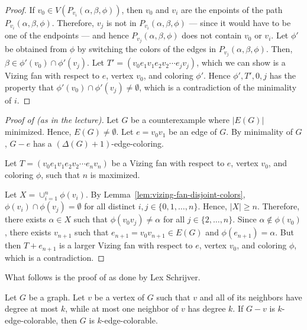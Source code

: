 \begin{proof}
    If \(v_0 \in V(P_{v_i}(\alpha, \beta, \phi))\),
    then \(v_0\) and \(v_i\) are the enpoints of the path \(P_{v_i}(\alpha, \beta, \phi)\).
    Therefore, \(v_j\) is not in \(P_{v_i}(\alpha, \beta, \phi)\) --- since it would have to be one of the endpoints ---
    and hence \(P_{v_j}(\alpha, \beta, \phi)\) does not contain \(v_0\) or \(v_i\).
    Let \(\phi'\) be obtained from \(\phi\) by
    switching the colors of the edges in \(P_{v_j}(\alpha, \beta, \phi)\).
    Then, \(\beta \in \phi'(v_0) \cap \phi'(v_j)\).
    Let \(T' = (v_0e_1v_1e_2v_2 \cdots e_jv_j)\),
    which we can show is a Vizing fan with respect to \(e\), vertex \(v_0\), and coloring \(\phi'\).
    Hence \(\phi', T', 0, j\) has the property that \(\phi'(v_0) \cap \phi'(v_j) \neq \emptyset\), which is a contradiction of the minimality of \(i\).
\end{proof}

\begin{proof}[Proof of  (as in the lecture)]
    Let \(G\) be a counterexample where \(|E(G)|\) minimized.
    Hence, \(E(G) \neq \emptyset\). Let \(e = v_0v_1\) be an edge of \(G\).
    By minimality of \(G\), \(G - e\) has a \((\Delta(G) + 1)\)-edge-coloring.

    Let \(T = (v_0e_1v_1e_2v_2 \cdots e_nv_n)\) be a Vizing fan with respect to \(e\), vertex \(v_0\), and coloring \(\phi\), such that \(n\) is maximized.

    Let \(X = \cup_{i=1}^n \phi(v_i)\).
    By Lemma~\ref{lem:vizing-fan-disjoint-colors},
    \(\phi(v_i) \cap \phi(v_j) = \emptyset\) for all distinct \(i, j \in \{0, 1, \ldots, n\}\).
    Hence, \(|X| \geq n\).
    Therefore, there exists \(\alpha \in X\) such that \(\phi(v_0v_j) \neq \alpha\) for all \(j \in \{2, \ldots, n\}\).
    Since \(\alpha \notin \phi(v_0)\),
    there exists \(v_{n+1}\) such that \(e_{n+1} = v_0v_{n+1} \in E(G)\) and \(\phi(e_{n+1}) = \alpha\).
    But then \(T + e_{n+1}\) is a larger Vizing fan with respect to \(e\), vertex \(v_0\), and coloring \(\phi\), which is a contradiction.
\end{proof}

What follows is the proof of  as done by Lex Schrijver.

\begin{lemma} \label{lem:lex-schrijver}
    Let \(G\) be a graph.
    Let \(v\) be a vertex of \(G\) such that
    \(v\) and all of its neighbors have degree at most \(k\),
    while at most one neighbor of \(v\) has degree \(k\).
    If \(G - v\) is \(k\)-edge-colorable,
    then \(G\) is \(k\)-edge-colorable.
\end{lemma}

